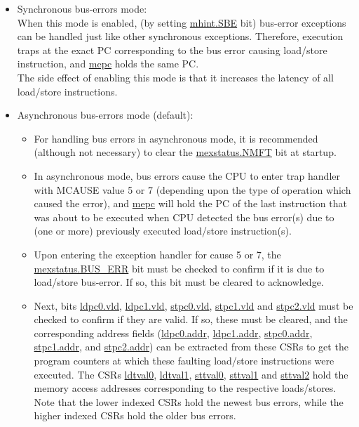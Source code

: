 \documentclass[main\_\_EN.tex]{subfiles}
\begin{document}
\begin{itemize}
    \item Synchronous bus-errors mode: \\
    When this mode is enabled, (by setting \hyperref[fielddesc:MHINT_SBE]{mhint.SBE} bit) bus-error exceptions can be handled just like other synchronous exceptions. Therefore, execution traps at the exact PC corresponding to the bus error causing load/store instruction, and \hyperref[regdesc:MEPC]{mepc} holds the same PC.\\
    The side effect of enabling this mode is that it increases the latency of all load/store instructions.
    \item Asynchronous bus-errors mode (default):
    \begin{itemize}
        \item For handling bus errors in asynchronous mode, it is recommended (although not necessary) to clear the \hyperref[fielddesc:MEXSTATUS_NMFT]{mexstatus.NMFT} bit at startup.\\
        \item In asynchronous mode, bus errors cause the CPU to enter trap handler with MCAUSE value 5 or 7 (depending upon the type of operation which caused the error), and \hyperref[regdesc:MEPC]{mepc} will hold the PC of the last instruction that was about to be executed when CPU detected the bus error(s) due to (one or more) previously executed load/store instruction(s).\\
         \item Upon entering the exception handler for cause 5 or 7, the \hyperref[fielddesc:MEXSTATUS_BUS_ERR]{mexstatus.BUS\_ERR} bit must be checked to confirm if it is due to load/store bus-error. If so, this bit must be cleared to acknowledge.\\
         \item Next, bits \hyperref[fielddesc:LDPC0_VLD]{ldpc0.vld}, \hyperref[fielddesc:LDPC1_VLD]{ldpc1.vld}, \hyperref[fielddesc:STPC0_VLD]{stpc0.vld}, \hyperref[fielddesc:STPC1_VLD]{stpc1.vld} and \hyperref[fielddesc:STPC2_VLD]{stpc2.vld} must be checked to confirm if they are valid. If so, these must be cleared, and the corresponding address fields (\hyperref[fielddesc:LDPC0_ADDR]{ldpc0.addr}, \hyperref[fielddesc:LDPC1_ADDR]{ldpc1.addr}, \hyperref[fielddesc:STPC0_ADDR]{stpc0.addr}, \hyperref[fielddesc:STPC1_ADDR]{stpc1.addr}, and \hyperref[fielddesc:STPC2_ADDR]{stpc2.addr}) can be extracted from these CSRs to get the program counters at which these faulting load/store instructions were executed. The CSRs \hyperref[regdesc:LDTVAL0]{ldtval0}, \hyperref[regdesc:LDTVAL1]{ldtval1}, \hyperref[regdesc:STTVAL0]{sttval0}, \hyperref[regdesc:STTVAL1]{sttval1} and \hyperref[regdesc:STTVAL2]{sttval2} hold the memory access addresses corresponding to the respective loads/stores. Note that the lower indexed CSRs hold the newest bus errors, while the higher indexed CSRs hold the older bus errors.\\

\end{itemize}
\end{itemize}
\end{document}
